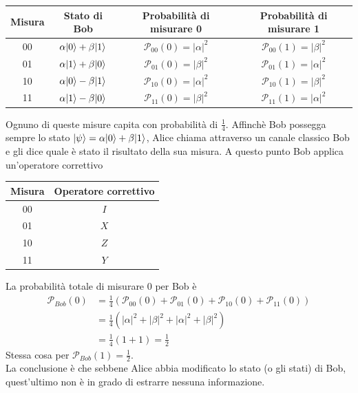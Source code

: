 \documentclass[12pt, a4paper]{report}
\begin{document}
\begin{center}
    \begin{tabular}{| c | c | c | c |}
        \hline
        \textbf{Misura} & \textbf{Stato di Bob} & \textbf{Probabilità di misurare 0} & \textbf{Probabilità di misurare 1}\\
        \hline
        00 & $\alpha| 0 \rangle+\beta| 1 \rangle$ & $\mathcal{P}_{00}(0) = \lvert \alpha \rvert^{2}$ & $\mathcal{P}_{00}(1) = \lvert \beta \rvert^{2}$\\
        \hline
        01 & $\alpha| 1 \rangle+\beta| 0 \rangle$ & $\mathcal{P}_{01}(0) = \lvert \beta \rvert^{2}$ & $\mathcal{P}_{01}(1) = \lvert \alpha \rvert^{2}$\\
        \hline
        10 & $\alpha| 0 \rangle-\beta| 1 \rangle$ & $\mathcal{P}_{10}(0) = \lvert \alpha \rvert^{2}$ & $\mathcal{P}_{10}(1) = \lvert \beta \rvert^{2}$\\
        \hline
        11 & $\alpha| 1 \rangle-\beta| 0 \rangle$ & $\mathcal{P}_{11}(0) = \lvert \beta \rvert^{2}$ & $\mathcal{P}_{11}(1) = \lvert \alpha \rvert^{2}$\\
        \hline
    \end{tabular}
\end{center}
Ognuno di queste misure capita con probabilità di $\frac{1}{4}$. Affinchè Bob possegga sempre lo stato $| \psi \rangle = \alpha| 0 \rangle+\beta| 1 \rangle$, Alice chiama attraverso un canale classico Bob e gli dice quale è stato il risultato della sua misura. A questo punto Bob applica un'operatore correttivo
\begin{center}
    \begin{tabular}{| c | c |}
        \hline
        \textbf{Misura} & \textbf{Operatore correttivo} \\
        \hline
        00 & $I$ \\
        \hline
        01 & $X$ \\
        \hline
        10 & $Z$ \\
        \hline
        11 & $Y$ \\
        \hline
    \end{tabular}
\end{center}
La probabilità totale di misurare 0 per Bob è
\begin{equation*}
    \begin{split}
        \mathcal{P}_{Bob}(0) &= \frac{1}{4}\left(\mathcal{P}_{00}(0)+\mathcal{P}_{01}(0)+\mathcal{P}_{10}(0)+\mathcal{P}_{11}(0)\right) \\
        &= \frac{1}{4}\left(\lvert \alpha \rvert^{2}+ \lvert \beta \rvert^{2} +\lvert \alpha \rvert^{2}+ \lvert \beta \rvert^{2}\right) \\
        &= \frac{1}{4}(1+1) = \frac{1}{2}
    \end{split}
\end{equation*}
Stessa cosa per $\mathcal{P}_{Bob}(1)=\frac{1}{2}$.\\
La conclusione è che sebbene Alice abbia modificato lo stato (o gli stati) di Bob, quest'ultimo non è in grado di estrarre nessuna informazione.
\end{document}

